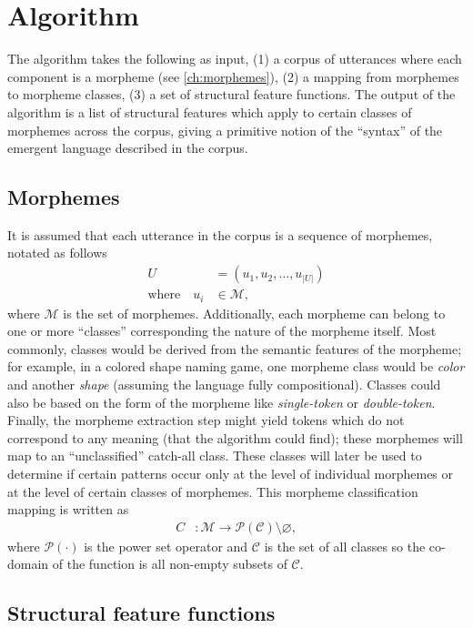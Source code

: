 \section{Algorithm}

The algorithm takes the following as input,
  (1) a corpus of utterances where each component is a morpheme (see \cref{ch:morphemes}),
  (2) a mapping from morphemes to morpheme classes,
  (3) a set of structural feature functions.
The output of the algorithm is a list of structural features which apply to certain classes of morphemes across the corpus, giving a primitive notion of the ``syntax'' of the emergent language described in the corpus.


\subsection{Morphemes}
It is assumed that each utterance in the corpus is a sequence of morphemes, notated as follows
\begin{align}
  U &= (u_1, u_2, \dots, u_{|U|}) \\
  \text{where}\quad u_i &\in \mathcal M
  ,
\end{align}
where $\mathcal M$ is the set of morphemes.
Additionally, each morpheme can belong to one or more ``classes'' corresponding the nature of the morpheme itself.
Most commonly, classes would be derived from the semantic features of the morpheme;
  for example, in a colored shape naming game, one morpheme class would be \emph{color} and another \emph{shape} (assuming the language fully compositional).
Classes could also be based on the form of the morpheme like \emph{single-token} or \emph{double-token}.
Finally, the morpheme extraction step might yield tokens which do not correspond to any meaning (that the algorithm could find); these morphemes will map to an ``unclassified'' catch-all class.
These classes will later be used to determine if certain patterns occur only at the level of individual morphemes or at the level of certain classes of morphemes.
This morpheme classification mapping is written as
\begin{align}
  C &: \mathcal M \rightarrow \mathcal P(\mathcal C) \setminus \varnothing
  ,
\end{align}
where $\mathcal P(\cdot)$ is the power set operator and $\mathcal C$ is the set of all classes so the co-domain of the function is all non-empty subsets of $\mathcal C$.


\subsection{Structural feature functions}

